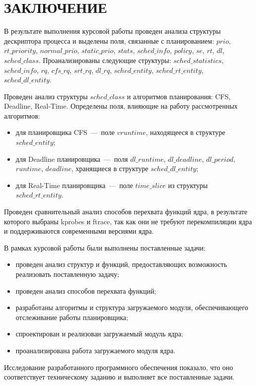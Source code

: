 \section*{\centering ЗАКЛЮЧЕНИЕ}

В результате выполнения курсовой работы проведен анализа структуры дескриптора процесса и выделены поля, связанные с планированием: $prio$, $rt\_priority$, $normal\_prio$, $static\_prio$, $stats$, $sched\_info$, $policy$, $se$, $rt$, $dl$, $sched\_class$.
Проанализированы следующие структуры: $sched\_statistics$, $sched\_info$, $rq$, $cfs\_rq$, $srt\_rq$, $dl\_rq$,  $sched\_entity$, $sched\_rt\_entity$, \\ $sched\_dl\_entity$.

Проведен анализ структуры $sched\_class$ и алгоритмов планирования: CFS, Deadline, Real-Time.
Определены поля, влияющие на работу рассмотренных алгоритмов:
\begin{itemize}[label=---]
	\item для планировщика CFS~---~поле $vruntime$, находящееся в структуре $sched\_entity$;
	\item для Deadline планировщика~---~поля $dl\_runtime$, $dl\_deadline$, $dl\_period$, $runtime$, $deadline$, хранящиеся в структуре $sched\_dl\_entity$;
	\item для Real-Time планировщика~---~поле $time\_slice$ из структуры \\ $sched\_rt\_entity$.
\end{itemize}

Проведен сравнительный анализ способов перехвата функций ядра, в результате которого выбраны kprobes и ftrace, так как они не требуют перекомпиляции ядра и поддерживаются современными версиями ядра.

В рамках курсовой работы были выполнены поставленные задачи:
\begin{itemize}[label=---]
	\item проведен анализ структур и функций, предоставляющих возможность реализовать поставленную задачу;
	\item проведен анализ способов перехвата функций;
	\item разработаны алгоритмы и структура загружаемого модуля, обеспечивающего отслеживание работы планировщика;
	\item спроектирован и реализован загружаемый модуль ядра;
	\item проанализирована работа загружаемого модуля ядра.
\end{itemize}

Исследование разработанного программного обеспечения показало, что оно соответствует техническому заданию и выполняет все поставленные задачи.


